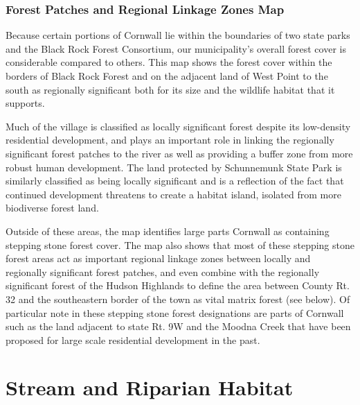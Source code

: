 \subsection*{Forest Patches and Regional Linkage Zones Map}
\label{subsec:forestpatchesandreglinkagezonesmap}
Because certain portions of Cornwall lie within the boundaries of two state
parks and the Black Rock Forest Consortium, our municipality’s overall forest
cover is considerable compared to others. This map shows the forest cover
within the borders of Black Rock Forest and on the adjacent land of West Point
to the south as regionally significant both for its size and the wildlife
habitat that it supports.
\par
Much of the village is classified as locally significant forest despite its
low-density residential development, and plays an important role in linking the
regionally significant forest patches to the river as well as providing a
buffer zone from more robust human development. The land protected by
Schunnemunk State Park is similarly classified as being locally significant and
is a reflection of the fact that continued development threatens to create a
habitat island, isolated from more biodiverse forest land.
\par
Outside of these areas, the map identifies large parts Cornwall as containing
stepping stone forest cover. The map also shows that most of these stepping
stone forest areas act as important regional linkage zones between locally and
regionally significant forest patches, and even combine with the regionally
significant forest of the Hudson Highlands to define the area between County
Rt. 32 and the southeastern border of the town as vital matrix forest (see
below). Of particular note in these stepping stone forest designations are
parts of Cornwall such as the land adjacent to state Rt. 9W and the Moodna
Creek that have been proposed for large scale residential development in the
past.

\label{map:forestpatches}

\chapter{Stream and Riparian Habitat}\label{subsec:streamandriparianhabitat}
